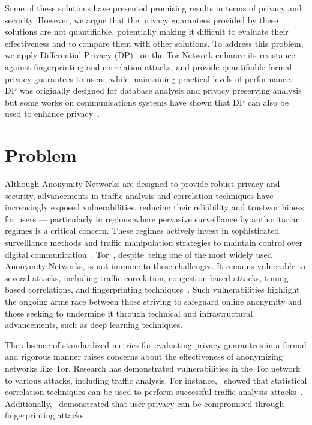Some of these solutions have presented promising results in terms of privacy and security. However, we argue that the privacy guarantees provided by these solutions are not quantifiable, potentially making it difficult to evaluate their effectiveness and to compare them with other solutions. To address this problem, we apply Differential Privacy (DP)~\cite*{DifPrivacy,DifPrivacyCalNoise,DP_Book} on the Tor Network enhance its resistance against fingerprinting and correlation attacks, and provide quantifiable formal privacy guarantees to users, while maintaining practical levels of performance. DP was originally designed for database analysis and privacy preserving analysis but some works on communications systems have shown that DP can also be used to enhance privacy~\cite*{Loopix, Stadium, VilalongaINForum, StatPrivStreaming, NetShaper}. 


\section{Problem}\label{sec:problem}
Although Anonymity Networks are designed to provide robust privacy and security, advancements in traffic analysis and correlation techniques have increasingly exposed vulnerabilities, reducing their reliability and trustworthiness for users — particularly in regions where pervasive surveillance by authoritarian regimes is a critical concern. These regimes actively invest in sophisticated surveillance methods and traffic manipulation strategies to maintain control over digital communication~\cite*{aryan2013internet, zittrain2017shifting, alimardani2018internet}.
Tor~\cite{dingledine2004tor}, despite being one of the most widely used Anonymity Networks, is not immune to these challenges. It remains vulnerable to several attacks, including traffic correlation, congestion-based attacks, timing-based correlations, and fingerprinting techniques~\cite*{chakravarty2014trafficanalysis, johnson2013users,winter2012great, robjansen2019dosontor}. Such vulnerabilities highlight the ongoing arms race between those striving to safeguard online anonymity and those seeking to undermine it through technical and infrastructural advancements, such as deep learning techniques.

The absence of standardized metrics for evaluating privacy guarantees in a formal and rigorous manner raises concerns about the effectiveness of anonymizing networks like Tor. Research has demonstrated vulnerabilities in the Tor network to various attacks, including traffic analysis. For instance,~\citeauthor{chakravarty2014trafficanalysis} showed that statistical correlation techniques can be used to perform successful traffic analysis attacks~\cite{chakravarty2014trafficanalysis}. Additionally,~\citeauthor{yi2009fingerprinting} demonstrated that user privacy can be compromised through fingerprinting attacks~\cite{yi2009fingerprinting}.


